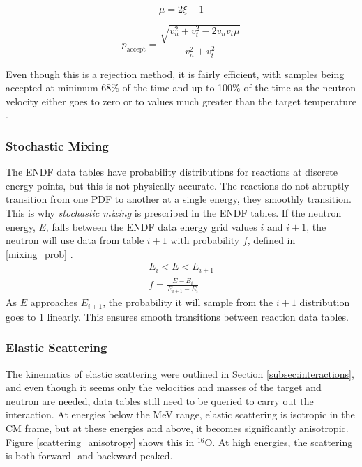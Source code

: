 \begin{equation}
\label{mu_samp}
\mu = 2\xi - 1 
\end{equation}

\begin{equation}
\label{prob_accept}
p_\mathrm{accept} = \frac{\sqrt{v_n^2+v_t^2-2 v_n v_t \mu}}{v_n^2+v_t^2}
\end{equation}

Even though this is a rejection method, it is fairly efficient, with samples being accepted at minimum 68\% of the time and up to 100\% of the time as the neutron velocity either goes to zero or to values much greater than the target temperature \cite{mcnp}.

\subsubsection{Stochastic Mixing}

The ENDF data tables have probability distributions for reactions at discrete energy points, but this is not physically accurate.  The reactions do not abruptly transition from one PDF to another at a single energy, they smoothly transition.  This is why \emph{stochastic mixing} is prescribed in the ENDF tables.  If the neutron energy, $E$, falls between the ENDF data energy grid values $i$ and $i+1$, the neutron will use data from table $i+1$ with probability $f$, defined in \eqref{mixing_prob} \cite{openmc}.
%
\begin{equation}
\label{mixing_prob}
\begin{gathered}
E_i < E < E_{i+1} \\
f = \frac{E-E_i}{E_{i+1}-E_i}
\end{gathered}
\end{equation}
%
As $E$ approaches $E_{i+1}$, the probability it will sample from the $i+1$ distribution goes to 1 linearly.  This ensures smooth transitions between reaction data tables.


\subsubsection{Elastic Scattering}

The kinematics of elastic scattering were outlined in Section \ref{subsec:interactions}, and even though it seems only the velocities and masses of the target and neutron are needed, data tables still need to be queried to carry out the interaction.  At energies below the MeV range, elastic scattering is isotropic in the CM frame, but at these energies and above, it becomes significantly anisotropic.  Figure \ref{scattering_anisotropy} shows this in $^{16}$O.  At high energies, the scattering is both forward- and backward-peaked.  

